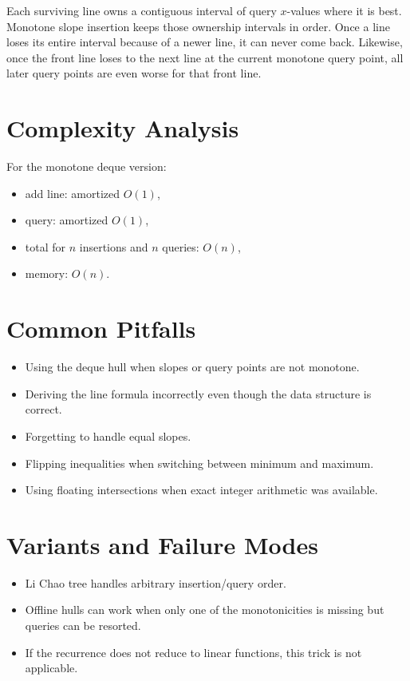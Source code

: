 Each surviving line owns a contiguous interval of query \(x\)-values where it is best. Monotone slope insertion keeps
those ownership intervals in order. Once a line loses its entire interval because of a newer line, it can never come
back. Likewise, once the front line loses to the next line at the current monotone query point, all later query points
are even worse for that front line.

\section*{Complexity Analysis}

For the monotone deque version:

\begin{itemize}
  \item add line: amortized \(O(1)\),
  \item query: amortized \(O(1)\),
  \item total for \(n\) insertions and \(n\) queries: \(O(n)\),
  \item memory: \(O(n)\).
\end{itemize}

\section*{Common Pitfalls}

\begin{itemize}
  \item Using the deque hull when slopes or query points are not monotone.
  \item Deriving the line formula incorrectly even though the data structure is correct.
  \item Forgetting to handle equal slopes.
  \item Flipping inequalities when switching between minimum and maximum.
  \item Using floating intersections when exact integer arithmetic was available.
\end{itemize}

\section*{Variants and Failure Modes}

\begin{itemize}
  \item Li Chao tree handles arbitrary insertion/query order.
  \item Offline hulls can work when only one of the monotonicities is missing but queries can be resorted.
  \item If the recurrence does not reduce to linear functions, this trick is not applicable.
\end{itemize}

